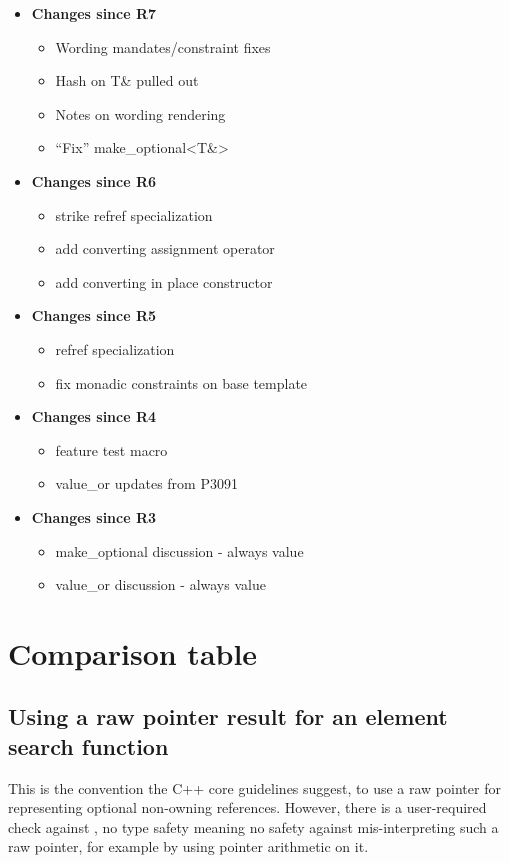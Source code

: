 \documentclass[a4paper,10pt,oneside,openany,final,article]{memoir}
\begin{document}
\begin{itemize}
\item \textbf{Changes since R7}
  \begin{itemize}
  \item Wording mandates/constraint fixes
  \item Hash on T\& pulled out
  \item Notes on wording rendering
  \item ``Fix'' make_optional<T\&>
  \end{itemize}
\item \textbf{Changes since R6}
  \begin{itemize}
  \item strike refref specialization
  \item add converting assignment operator
  \item add converting in place constructor
  \end{itemize}
\item \textbf{Changes since R5}
  \begin{itemize}
  \item refref specialization
  \item fix monadic constraints on base template
  \end{itemize}
\item \textbf{Changes since R4}
  \begin{itemize}
  \item feature test macro
  \item value_or updates from P3091
  \end{itemize}
\item \textbf{Changes since R3}
  \begin{itemize}
  \item make_optional discussion - always value
  \item value_or discussion - always value
  \end{itemize}
\end{itemize}

\chapter{Comparison table}
\section{Using a raw pointer result for an element search function}

This is the convention the C++ core guidelines suggest, to use a raw pointer for representing optional non-owning references.
However, there is a user-required check against , no type safety meaning no safety against mis-interpreting such a raw pointer, for example by using pointer arithmetic on it.
\end{document}
